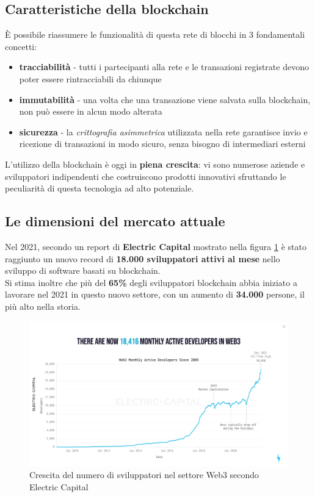 \documentclass[12pt,a4paper]{report}
\begin{document}
\subsection{Caratteristiche della blockchain}

È possibile riassumere le funzionalità di questa rete di blocchi in 3 fondamentali concetti:

\begin{itemize}
  \item \textbf{tracciabilità} - tutti i partecipanti alla rete e le transazioni registrate devono poter essere rintracciabili da chiunque
  \item \textbf{immutabilità} - una volta che una transazione viene salvata sulla blockchain, non può essere in alcun modo alterata
  \item \textbf{sicurezza} - la \textit{crittografia asimmetrica} utilizzata nella rete garantisce invio e ricezione di transazioni in modo sicuro, senza bisogno di intermediari esterni
\end{itemize}

\noindent L'utilizzo della blockchain è oggi in \textbf{piena crescita}: vi sono numerose aziende e sviluppatori indipendenti che costruiscono prodotti innovativi sfruttando le peculiarità di questa tecnologia ad alto potenziale.


\subsection{Le dimensioni del mercato attuale}

\noindent Nel 2021, secondo un report di \textbf{Electric Capital}\cite{web3_dev} mostrato nella figura \ref{fig:web3_dev} è stato raggiunto un nuovo record di \textbf{18.000 sviluppatori attivi al mese} nello sviluppo di software basati su blockchain. \\Si stima inoltre che più del \textbf{65\%} degli sviluppatori blockchain abbia iniziato a lavorare nel 2021 in questo nuovo settore, con un aumento di \textbf{34.000} persone, il più alto nella storia.

\begin{figure}[H]
  \includegraphics[scale=0.3]{web3_dev.png}
  \centering
  \caption{Crescita del numero di sviluppatori nel settore Web3 secondo Electric Capital}
  \label{fig:web3_dev}
\end{figure}
\end{document}
